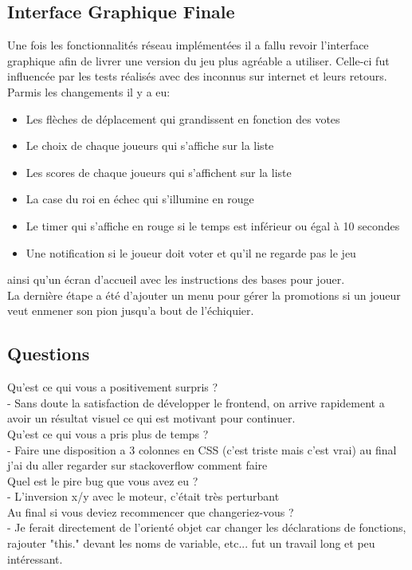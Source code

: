 \documentclass{article}
\begin{document}
\subsection{Interface Graphique Finale}
Une fois les fonctionnalités réseau implémentées il a fallu revoir l'interface graphique afin de livrer une version du jeu plus agréable a utiliser. Celle-ci fut influencée par les tests réalisés avec des inconnus sur internet et leurs retours.\\
Parmis les changements il y a eu:
\begin{itemize}
 \item Les flèches de déplacement qui grandissent en fonction des votes
 \item Le choix de chaque joueurs qui s'affiche sur la liste
 \item Les scores de chaque joueurs qui s'affichent sur la liste
 \item La case du roi en échec qui s'illumine en rouge
 \item Le timer qui s'affiche en rouge si le temps est inférieur ou égal à 10 secondes
 \item Une notification si le joueur doit voter et qu'il ne regarde pas le jeu
\end{itemize}
ainsi qu'un écran d'accueil avec les instructions des bases pour jouer.\\
La dernière étape a été d'ajouter un menu pour gérer la promotions si un joueur veut enmener son pion jusqu'a bout de l'échiquier.
\subsection{Questions}
Qu’est ce qui vous a positivement surpris ?\\
 - Sans doute la satisfaction de développer le frontend, on arrive rapidement a avoir un résultat visuel ce qui est motivant pour continuer.\\
Qu’est ce qui vous a pris plus de temps ?\\
 - Faire une disposition a 3 colonnes en CSS (c'est triste mais c'est vrai) au final j'ai du aller regarder sur stackoverflow comment faire\\
Quel est le pire bug que vous avez eu ?\\
 - L'inversion x/y avec le moteur, c'était très perturbant\\
Au final si vous deviez recommencer que changeriez-vous ?\\
 - Je ferait directement de l'orienté objet car changer les déclarations de fonctions, rajouter "this." devant les noms de variable, etc... fut un travail long et peu intéressant.
\end{document}
